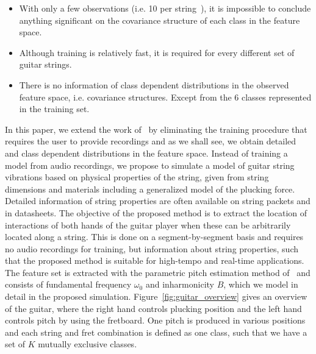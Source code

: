 \documentclass{article}
\begin{document}
\begin{sloppy}
\begin{itemize}
    \item With only a few observations (i.e. 10 per string~\cite{hjerrild::icassp19}), it is impossible to conclude anything significant on the covariance structure of each class in the feature space.
    \item Although training is relatively fast, it is required for every different set of guitar strings.
        \item There is no information of class dependent distributions in the observed feature space, i.e. covariance structures. Except from the 6 classes represented in the training set.
\end{itemize}
In this paper, we extend the work of~\cite{hjerrild::icassp19} by eliminating the training procedure that requires the user to provide recordings and as we shall see, we obtain detailed and class dependent distributions in the feature space. Instead of training a model from audio recordings, we propose to simulate a model of guitar string vibrations based on physical properties of the string, given from string dimensions and materials including a generalized model of the plucking force. Detailed information of string properties are often available on string packets and in datasheets. The objective of the proposed method is to extract the location of interactions of both hands of the guitar player when these can be arbitrarily located along a string. This is done on a segment-by-segment basis and requires no audio recordings for training, but information about string properties, such that the proposed method is suitable for high-tempo and real-time applications. The feature set is extracted with the parametric pitch estimation method of~\cite{hjerrild::icassp19} and consists of fundamental frequency $\omega_0$ and inharmonicity $B$, which we model in detail in the proposed simulation. Figure~\ref{fig:guitar_overview} gives an overview of the guitar, where the right hand controls plucking position and the left hand controls pitch by using the fretboard. One pitch is produced in various positions and each string and fret combination is defined as one class, such that we have a set of $K$ mutually exclusive classes. 
%
%


\end{sloppy}
\end{document}
